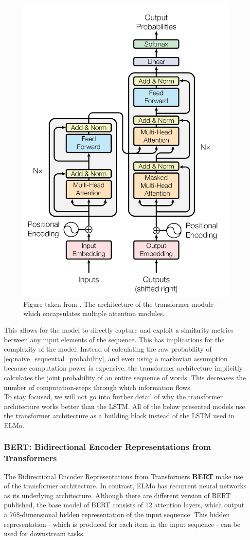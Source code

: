 \documentclass[a4paper,12pt,twoside,openright]{report}
\begin{document}
\begin{figure}[H]
	\center
  \includegraphics[width=0.5\linewidth]{./assets/background/transformer_module.png}
  \caption{Figure taken from \cite{vaswani17}. The architecture of the transformer module which encapsulates multiple attention modules.}
  \label{fig:attention_is_all_you_need}
\end{figure}

This allows for the model to directly capture and exploit a similarity metrics between any input elements of the sequence.
This has implications for the complexity of the model.
Instead of calculating the raw probability of \eqref{eq:naive_sequential_probability}, and even using a markovian assumption because computation power is expensive, the transformer architecture implicitly calculates the joint probability of an entire sequence of words.
This decreases the number of computation-steps through which information flows. \\

To stay focused, we will not go into further detail of why the transformer architecture works better than the LSTM.
All of the below presented models use the transformer architecture as a building block instead of the LSTM used in ELMo.

\subsubsection{BERT: Bidirectional Encoder Representations from Transformers}\label{section:BERT}
 
The Bidirectional Encoder Representations from Transformers \textbf{BERT} \cite{devlin18} make use of the transformer architecture.
In contrast, ELMo has recurrent neural networks as its underlying architecture.
Although there are different version of BERT published, the base model of BERT consists of 12 attention layers, which output a 768-dimensional hidden representation of the input sequence.
This hidden representation - which is produced for each item in the input sequence - can be used for downstream tasks.
\end{document}
